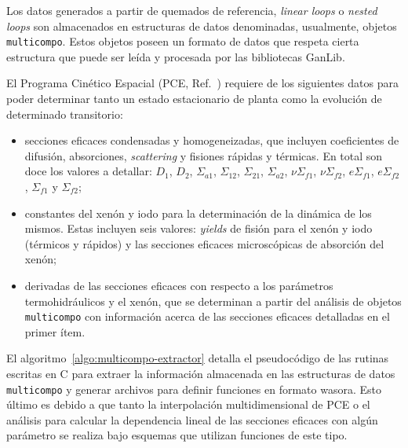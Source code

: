 \documentclass[11pt]{article}
\begin{document}
Los datos generados a partir de quemados de referencia, \emph{linear loops} o \emph{nested loops} son almacenados en estructuras de datos denominadas, usualmente, objetos \texttt{multicompo}. Estos objetos poseen un formato de datos que respeta cierta estructura que puede ser leída y procesada por las bibliotecas GanLib.

El Programa Cinético Espacial (PCE, Ref.~\cite{pumitacpl}) requiere de los siguientes datos para poder determinar tanto un estado estacionario de planta como la evolución de determinado transitorio:

\begin{itemize}
\renewcommand\labelitemi{$\cdot$}
 \item secciones eficaces condensadas y homogeneizadas, que incluyen coeficientes de difusión, absorciones, \emph{scattering} y fisiones rápidas y térmicas. En total son doce los valores a detallar: $D_{1}$, $D_{2}$, $\Sigma_{a1}$, $\Sigma_{12}$, $\Sigma_{21}$, $\Sigma_{a2}$, $\nu\Sigma_{f1}$, $\nu\Sigma_{f2}$, $e\Sigma_{f1}$, $e\Sigma_{f2}$, $\Sigma_{f1}$ y $\Sigma_{f2}$;
 \item constantes del xenón y iodo para la determinación de la dinámica de los mismos. Estas incluyen seis valores: \emph{yields} de fisión para el xenón y iodo (térmicos y rápidos) y las secciones eficaces microscópicas de absorción del xenón;
 \item derivadas de las secciones eficaces con respecto a los parámetros termohidráulicos y el xenón, que se determinan a partir del análisis de objetos \texttt{multicompo} con información acerca de las secciones eficaces detalladas en el primer ítem.
\end{itemize}

El algoritmo~\ref{algo:multicompo-extractor} detalla el pseudocódigo de las rutinas escritas en C para extraer la información almacenada en las estructuras de datos \texttt{multicompo} y generar archivos para definir funciones en formato wasora. Esto último es debido a que tanto la interpolación multidimensional de PCE o el análisis para calcular la dependencia lineal de las secciones eficaces con algún parámetro se realiza bajo esquemas que utilizan funciones de este tipo.
\end{document}
